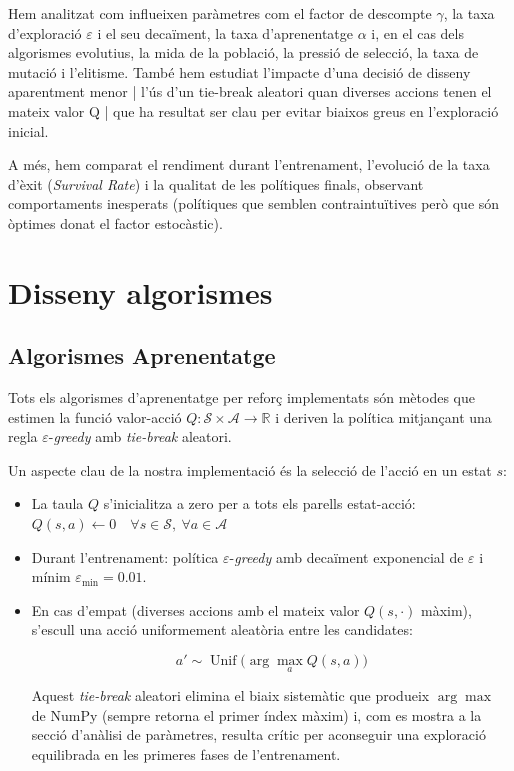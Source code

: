 \documentclass[12pt,a4paper]{report}
\begin{document}
Hem analitzat com influeixen paràmetres com el factor de descompte $\gamma$, la taxa d'exploració $\varepsilon$
i el seu decaïment, la taxa d'aprenentatge $\alpha$ i, en el cas dels algorismes evolutius,
la mida de la població, la pressió de selecció, la taxa de mutació i l'elitisme. També hem estudiat l'impacte
d'una decisió de disseny aparentment menor | l'ús d'un tie-break aleatori quan diverses accions tenen el mateix
valor Q | que ha resultat ser clau per evitar biaixos greus en l'exploració inicial.

A més, hem comparat el rendiment durant l'entrenament, l'evolució de la taxa d'èxit (\textit{Survival Rate}) i la qualitat de les
polítiques finals, observant comportaments inesperats (polítiques que semblen contraintuïtives però que són
òptimes donat el factor estocàstic).

\chapter{Disseny algorismes}
\label{ch:design}

\section{Algorismes Aprenentatge}

Tots els algorismes d'aprenentatge per reforç implementats són mètodes que estimen la funció valor-acció
$Q: \mathcal{S} \times \mathcal{A} \to \mathbb{R}$ i deriven la política mitjançant una regla
$\varepsilon$-\textit{greedy} amb \textit{tie-break} aleatori.

Un aspecte clau de la nostra implementació és la selecció de l'acció en un estat $s$:

\begin{itemize}
  \item La taula $Q$ s'inicialitza a zero per a tots els parells estat-acció:
    $Q(s,a) \gets 0 \quad \forall s \in \mathcal{S},\ \forall a \in \mathcal{A}$
  \item Durant l'entrenament: política $\varepsilon$-\textit{greedy} amb decaïment exponencial de $\varepsilon$ i mínim
    $\varepsilon_{\min} = 0.01$.
  \item En cas d'empat (diverses accions amb el mateix valor $Q(s,\cdot)$ màxim), s'escull una acció
    uniformement aleatòria entre les candidates:

  \[
    a' \sim \operatorname{Unif}\!\bigl(\arg\max_{a} Q(s,a)\bigr)
  \]

  Aquest \textit{tie-break} aleatori elimina el biaix sistemàtic que produeix $\arg\max$ de NumPy
  (sempre retorna el primer índex màxim) i, com es mostra a la secció d'anàlisi de paràmetres, resulta crític
  per aconseguir una exploració equilibrada en les primeres fases de l'entrenament.
\end{itemize}
\end{document}
